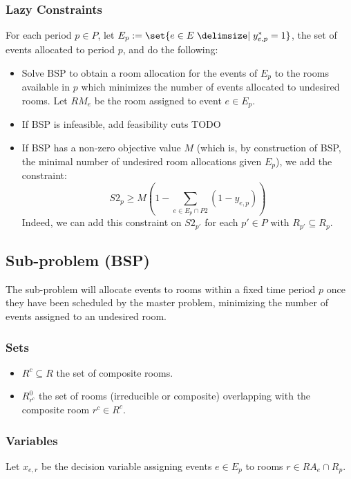 \documentclass{article}
\theoremstyle{plain}
\numberwithin{theorem}{section}
\numberwithin{example}{section}
\theoremstyle{definition}
\begin{document}
\subsubsection*{Lazy Constraints}
For each period $p \in P$, let $E_p := \set{e \in E \given y^*_{e, p} = 1}$, the
set of events allocated to period $p$, and do the following:
\begin{itemize}
    \item Solve BSP to obtain a room allocation for the events of $E_p$ to the
        rooms available in $p$ which minimizes the number of events allocated to
        undesired rooms. Let $RM_e$ be the room assigned to event $e \in E_p$.
    \item If BSP is infeasible, add feasibility cuts TODO
    \item If BSP has a non-zero objective value $M$ (which is, by construction
        of BSP, the minimal number of undesired room allocations given $E_p$),
        we add the constraint:
        \begin{equation}
            S2_p \geq M \left(1 - \sum_{e \in E_p \cap P2} (1 - y_{e, p})\right)
        \end{equation}
        Indeed, we can add this constraint on $S2_{p'}$ for each $p' \in P$ with
        $R_{p'} \subseteq R_p$.
\end{itemize}

\subsection{Sub-problem (BSP)}\label{BSP}
The sub-problem will allocate events to rooms within a fixed time period $p$
once they have been scheduled by the master problem, minimizing the number of
events assigned to an undesired room.

\subsubsection*{Sets}
\begin{itemize}
    \item $R^c \subseteq R$ the set of composite rooms.
    \item $R^0_{r^c}$ the set of rooms (irreducible or composite) overlapping
        with the composite room $r^c \in R^c$.
\end{itemize}

\subsubsection*{Variables}
Let $x_{e,r}$ be the decision variable assigning events $e \in E_p$ to rooms $r
\in RA_e \cap R_p$.
\end{document}
